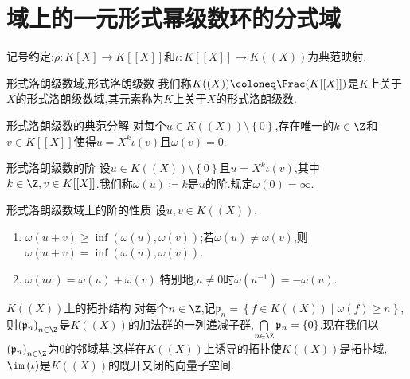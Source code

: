 \section{域上的一元形式幂级数环的分式域}

记号约定:$\rho:K[X]\to K[[X]]$和$\iota:K[[X]]\to K((X))$为典范映射.

\begin{definition}{形式洛朗级数域,形式洛朗级数}{}
	我们称$K((X))\coloneq\Frac(K[[X]])$是$K$上关于$X$的形式洛朗级数域,其元素称为$K$上关于$X$的形式洛朗级数.
\end{definition}

\begin{proposition}{形式洛朗级数的典范分解}{}
	对每个$u\in K((X))\setminus\left\{0\right\}$,存在唯一的$k\in\Z$和$v\in K[[X]]$使得$u=X^{k}\iota\left(v\right)$且$\omega\left(v\right)=0$.
\end{proposition}

\begin{definition}{形式洛朗级数的阶}{}
	设$u\in K((X))\setminus\left\{0\right\}$且$u=X^{k}\iota\left(v\right)$,其中$k\in\Z,v\in K[[X]]$.我们称$\omega\left(u\right)\coloneq k$是$u$的阶.规定$\omega\left(0\right)=\infty$.
\end{definition}

\begin{proposition}{形式洛朗级数域上的阶的性质}{}
	设$u,v\in K((X))$.
	\begin{enumerate}
		\item $\omega\left(u+v\right)\geq\inf\left(\omega\left(u\right),\omega\left(v\right)\right)$;若$\omega\left(u\right)\neq\omega\left(v\right)$,则$\omega\left(u+v\right)=\inf\left(\omega\left(u\right),\omega\left(v\right)\right)$.
		\item $\omega\left(uv\right)=\omega\left(u\right)+\omega\left(v\right)$.特别地,$u\neq 0$时$\omega\left(u^{-1}\right)=-\omega\left(u\right)$.
	\end{enumerate}
\end{proposition}

\begin{remark}{$K((X))$上的拓扑结构}{}
	对每个$n\in\Z$,记$\mathfrak{p}_{n}=\left\{f\in K((X))\middle|\omega\left(f\right)\geq n\right\}$,则$\left(\mathfrak{p}_{n}\right)_{n\in\Z}$是$K((X))$的加法群的一列递减子群,$\bigcap\limits_{n\in\Z}\mathfrak{p}_{n}=\left\{0\right\}$.现在我们以$\left(\mathfrak{p}_{n}\right)_{n\in\Z}$为$0$的邻域基,这样在$K((X))$上诱导的拓扑使$K((X))$是拓扑域,$\im\left(\iota\right)$是$K((X))$的既开又闭的向量子空间.
\end{remark}

